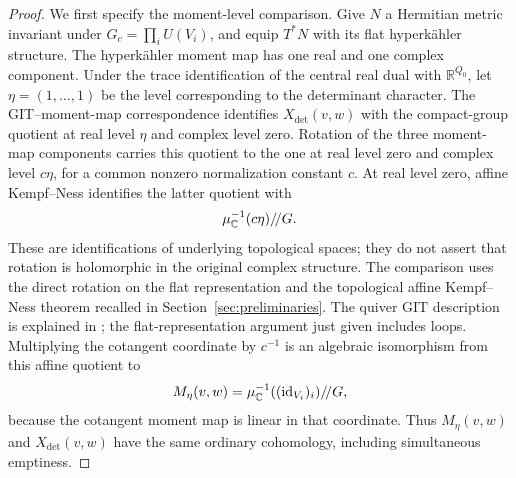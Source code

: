 \begin{proof}
We first specify the moment-level comparison.  Give $N$ a Hermitian
metric invariant under $G_c=\prod_iU(V_i)$, and equip $T^*N$ with its flat
hyperk\"ahler structure.  The hyperk\"ahler moment map has one real and one
complex component.  Under the trace identification of the central real
dual with $\mathbb R^{Q_0}$, let $\eta=(1,\ldots,1)$ be the level corresponding to
the determinant character.  The GIT--moment-map correspondence identifies
$X_{\det}(v,w)$ with the compact-group quotient at real level $\eta$ and
complex level zero.  Rotation of the three moment-map components carries
this quotient to the one at real level zero and complex level $c\eta$,
for a common nonzero normalization constant $c$.  At real level zero,
affine Kempf--Ness identifies the latter quotient with
\[
 \mu_{\mathbb C}^{-1}(c\eta)/\!/G.
\]
These are identifications of underlying topological spaces; they do not
assert that rotation is holomorphic in the original complex structure.
The comparison uses the direct rotation on the flat representation
\cite[Section~3(D)]{HKLR87} and the topological affine Kempf--Ness
theorem recalled in Section~\ref{sec:preliminaries}.
The quiver GIT description is explained in \cite{Nakajima94}; the
flat-representation argument just given includes loops.
Multiplying the cotangent coordinate by $c^{-1}$
is an algebraic isomorphism from this affine quotient to
\[
 M_\eta(v,w)=\mu_{\mathbb C}^{-1}
       ((\mathrm{id}_{V_i})_i)/\!/G,
\]
because the cotangent moment map is linear in that coordinate.  Thus
$M_\eta(v,w)$ and $X_{\det}(v,w)$ have the same ordinary cohomology,
including simultaneous emptiness.


\end{proof}
